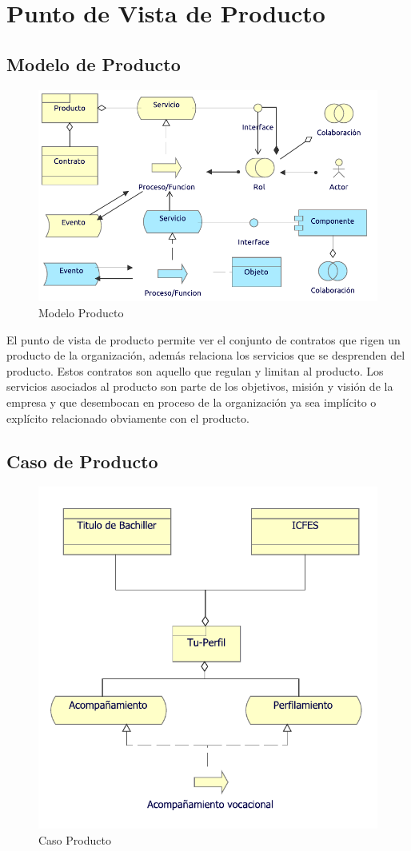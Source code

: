 \section{Punto de Vista de Producto}


\subsection{Modelo de Producto}
\begin{figure}[h!]
	\centering
	\includegraphics[width=.6\linewidth]{imgs/modelo/Producto.pdf}
	\caption{Modelo Producto}
\end{figure}

El punto de vista de producto permite ver el conjunto de contratos que rigen un producto de la organización, además relaciona los servicios que se desprenden del producto. Estos contratos son aquello que regulan y limitan  al producto. Los servicios asociados al producto son parte de los objetivos, misión y visión de la empresa y que desembocan en proceso de la organización ya sea implícito o explícito relacionado obviamente con el producto.

\newpage
\subsection{Caso  de Producto}
\begin{figure}[h!]
	\centering
	\includegraphics[width=.9\linewidth]{imgs/caso/negocio/producto.pdf}
	\caption{Caso Producto}
\end{figure}

